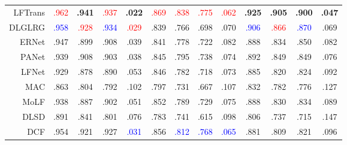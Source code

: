 \begin{table}[!ht]
{\begin{tabular}{rcccccccccccc}
			LFTrans \upcite{liu2023lftransnet}
			& \textcolor{red}{.962} & \textbf{.941} & \textcolor{red}{.937} & \textbf{.022}
			& \textcolor{red}{.869} & \textcolor{red}{.838} & \textcolor{red}{.775} & \textcolor{red}{.062}
			& \textbf{.925} & \textbf{.905} & \textbf{.900} & \textbf{.047}
			\\
			
			DLGLRG \upcite{liu2021light} 
			& \textcolor{blue}{.958} & {\textcolor{red}{.928}} 			& {\textcolor{blue}{.934}} & {\textcolor{red}{.029}} 
			&	.839 &	.766 &	.698 &	.070 
			& \textcolor{blue}{.906} &	\textcolor{red}{.866} &	\textcolor{blue}{.870} &	.069
			\\
			
			ERNet \upcite{piao2020exploit}
			& .947 & .899 & .908 & .039 
			&	.841 &	.778 &	.722 &	.082 
			&	.888 &	.834 &	.850 &	.082 
			\\
			
			PANet \upcite{piao2021panet} 
			& .939 & .908 & .903 & .038 
			& .845 & .795 & .738 & .074 
			& .892 & .849 & .849 & .076
			\\
			
			LFNet	 \upcite{zhang2020lfnet} 
			& .929 & .878 & .890 & .053
			&	.846 &	.782 &	.718 &	.073 
			&	.885 &	.820 &	.824 &	.092 \\
			
			MAC	 \upcite{zhang2020light} 
			& .863	& .804	& .792	& .102	
			&   .797 & .731 & .667 & .107 
			& .832 & .782 & .776 & .127 \\
			
			MoLF	 \upcite{zhang2019memory} 
			& .938 & .887 & .902 & .051 
			&	.852 &	.789 &	.729 &	.075 
			&	.888 &	.830 &	.834 &	.089 \\
			
			DLSD	\upcite{piao2019deep}
			& .891	& .841	& .801	& .076	
			&   .783 & .741 & .615 & .098 
			& .806 & .737 & .715 & .147 \\
			
			\midrule %
			
			
			DCF \upcite{ji2021calibrated} 
			
			& .954 & .921 & .927 & \textcolor{blue}{.031}
			& .856 & \textcolor{blue}{.812} & \textcolor{blue}{.768} & \textcolor{blue}{.065}
			& .881 & .809 & .821 & .096 \\
			

\end{tabular}}
\end{table}
